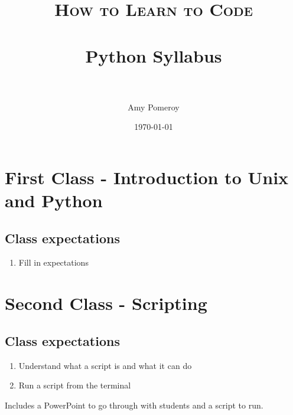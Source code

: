 \documentclass[paper=a4, fontsize=11pt]{scrartcl} %
\title{	
\normalfont \normalsize 
\textsc{How to Learn to Code} \\ [25pt] %
\horrule{0.5pt} \\[0.4cm] %
\huge Python Syllabus \\ %
\horrule{2pt} \\[0.5cm] %
}
\author{Amy Pomeroy} %
\date{\normalsize\today} %
\numberwithin{equation}{section} %
\numberwithin{figure}{section} %
\numberwithin{table}{section} %
\begin{document}
\maketitle %


\section{First Class - Introduction to Unix and Python} 


\subsection{Class expectations}

\begin{enumerate}
\item Fill in expectations 
\end{enumerate}


\section{Second Class - Scripting}


\subsection{Class expectations}

\begin{enumerate}
\item Understand what a script is and what it can do
\item Run a script from the terminal

\end{enumerate}

Includes a PowerPoint to go through with students and a script to
run. 

\end{document}

